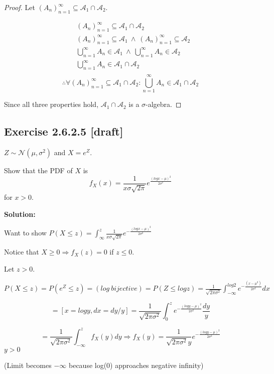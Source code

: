 \documentclass{article}
\begin{document}
\begin{proof}
Let \((A_n)_{n=1}^\infty\subseteq \mathcal{A}_1\cap \mathcal{A}_2\).

\begin{align*}
    & (A_n)_{n=1}^\infty\subseteq \mathcal{A}_1\cap \mathcal{A}_2 \\
    & (A_n)_{n=1}^\infty\subseteq \mathcal{A}_1\ \wedge\ (A_n)_{n=1}^\infty\subseteq \mathcal{A}_2 \\
    & \bigcup_{n=1}^\infty A_n \in \mathcal{A}_1\ \wedge\ \bigcup_{n=1}^\infty A_n \in \mathcal{A}_2 \\
    & \bigcup_{n=1}^\infty A_n \in \mathcal{A}_1\cap\mathcal{A}_2 \\
\end{align*}
\[\therefore \forall (A_n)_{n=1}^\infty \subseteq \mathcal{A}_1\cap\mathcal{A}_2: \bigcup_{n=1}^\infty A_n\in \mathcal{A}_1\cap \mathcal{A_2}\]

Since all three properties hold, \(\mathcal{A}_1\cap\mathcal{A}_2\) is a \(\sigma\)-algebra.
\end{proof}

\subsection{Exercise 2.6.2.5 [draft]}

\(Z\sim \mathcal{N}(\mu, \sigma^2)\)
and \(X=e^Z\).

Show that the PDF of \(X\) is
\[f_X(x)=\frac{1}{x\sigma\sqrt{2\pi}}e^{\frac{(log x-\mu)^2}{2\sigma^2}}\]
for \(x>0\).

\textbf{Solution:}

Want to show \(P(X\leq z)=\int_{\infty}^z \frac{1}{x\sigma\sqrt{2\pi}}e^{-\frac{(logx-\mu)^2}{2\sigma^2}}\)

Notice that \(X\geq 0 \Rightarrow f_X(z)=0\) if \(z\leq 0\).

Let \(z>0\).

\(P(X\leq z)=P(e^Z\leq z)=(log\ bijective)=P(Z\leq log z)=\frac{1}{\sqrt{2\pi \sigma^2}}\int_{-\infty}^{log 2}e^{-\frac{(x-\mu^2)}{2\sigma^2}}dx\)

\[= [x=log y, dx=dy/y] = \frac{1}{\sqrt{2\pi\sigma^2}}\int_0^z e^{-\frac{(log y - \mu)^2}{2\sigma^2}} \frac{dy}{y}\]

\[=\frac{1}{\sqrt{2\pi\sigma^2}}\int_{-\infty}^z f_X(y)dy \Rightarrow f_X(y)=\frac{1}{\sqrt{2\pi \sigma^2}y}e^{-\frac{(log y-\mu)^2}{2\sigma^2}}\]
\(y>0\)

(Limit becomes \(-\infty\) because log(0) approaches negative infinity)
\end{document}
